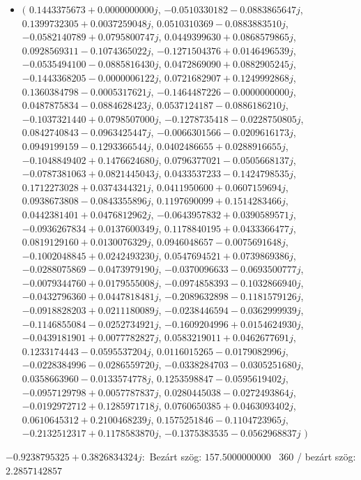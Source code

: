 \documentclass[14pt,a4paper]{article}
\begin{document}
\begin{itemize}
\item
$\big($
$0.1443375673+0.0000000000j$, $-0.0510330182-0.0883865647j$, $0.1399732305+0.0037259048j$, $0.0510310369-0.0883883510j$, $-0.0582140789+0.0795800747j$, $0.0449399630+0.0868579865j$, $0.0928569311-0.1074365022j$, $-0.1271504376+0.0146496539j$, $-0.0535494100-0.0885816430j$, $0.0472869090+0.0882905245j$, $-0.1443368205-0.0000006122j$, $0.0721682907+0.1249992868j$, $0.1360384798-0.0005317621j$, $-0.1464487226-0.0000000000j$, $0.0487875834-0.0884628423j$, $0.0537124187-0.0886186210j$, $-0.1037321440+0.0798507000j$, $-0.1278735418-0.0228750805j$, $0.0842740843-0.0963425447j$, $-0.0066301566-0.0209616173j$, $0.0949199159-0.1293366544j$, $0.0402486655+0.0288916655j$, $-0.1048849402+0.1476624680j$, $0.0796377021-0.0505668137j$, $-0.0787381063+0.0821445043j$, $0.0433537233-0.1424798535j$, $0.1712273028+0.0374344321j$, $0.0411950600+0.0607159694j$, $0.0938673808-0.0843355896j$, $0.1197690099+0.1514283466j$, $0.0442381401+0.0476812962j$, $-0.0643957832+0.0390589571j$, $-0.0936267834+0.0137600349j$, $0.1178840195+0.0433366477j$, $0.0819129160+0.0130076329j$, $0.0946048657-0.0075691648j$, $-0.1002048845+0.0242493230j$, $0.0547694521+0.0739869386j$, $-0.0288075869-0.0473979190j$, $-0.0370096633-0.0693500777j$, $-0.0079344760+0.0179555008j$, $-0.0974858393-0.1032866940j$, $-0.0432796360+0.0447818481j$, $-0.2089632898-0.1181579126j$, $-0.0918828203+0.0211180089j$, $-0.0238446594-0.0362999939j$, $-0.1146855084-0.0252734921j$, $-0.1609204996+0.0154624930j$, $-0.0439181901+0.0077782827j$, $0.0583219011+0.0462677691j$, $0.1233174443-0.0595537204j$, $0.0116015265-0.0179082996j$, $-0.0228384996-0.0286559720j$, $-0.0338284703-0.0305251680j$, $0.0358663960-0.0133574778j$, $0.1253598847-0.0595619402j$, $-0.0957129798+0.0057787837j$, $0.0280445038-0.0272493864j$, $-0.0192972712+0.1285971718j$, $0.0760650385+0.0463093402j$, $0.0610645312+0.2100468239j$, $0.1575251846-0.1104723965j$, $-0.2132512317+0.1178583870j$, $-0.1375383535-0.0562968837j$
$\big)$
\end{itemize}
$-0.9238795325+0.3826834324j$:\
Bezárt szög: $157.5000000000$ \
360 / bezárt szög: $2.2857142857$\
\end{document}
